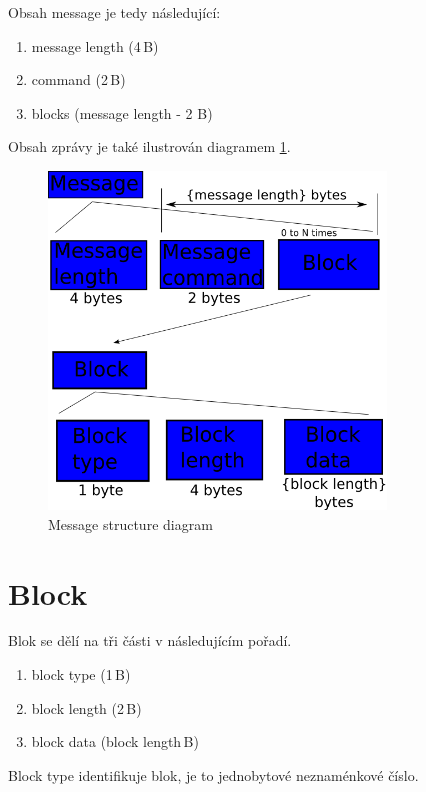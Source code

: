 \documentclass[12pt,oneside,a4paper]{report}
\begin{document}
Obsah message je tedy následující:

\begin{enumerate}
	\item message length (4\,{}B)
	\item command (2\,{}B)
	\item blocks (message length - 2 B)
\end{enumerate}

Obsah zprávy je také ilustrován diagramem \ref{picture.message_structure}.

\begin{figure}[h]
  \centering
  \includegraphics[width=0.80\textwidth]{diagrams/message_structure_diagram.png}
  \caption{Message structure diagram}
  \label{picture.message_structure}
\end{figure}

\section{Block}
\label{text.collab_message.block}

Blok se dělí na tři části v následujícím pořadí.

\begin{enumerate}
	\item block type (1\,{}B)
	\item block length (2\,{}B)
	\item block data (block length\,{}B)
\end{enumerate}

Block type identifikuje blok, je to jednobytové neznaménkové číslo.
\end{document}
